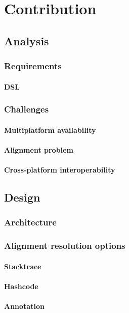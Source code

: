 \chapter{Contribution}\label{contribution}

\section{Analysis}
\subsection{Requirements}
\subsubsection{DSL}
\subsection{Challenges}
\subsubsection{Multiplatform availability}
\subsubsection{Alignment problem}
\subsubsection{Cross-platform interoperability}

\section{Design}
\subsection{Architecture}
\subsection{Alignment resolution options}
\subsubsection{Stacktrace}
\subsubsection{Hashcode}
\subsubsection{Annotation}
